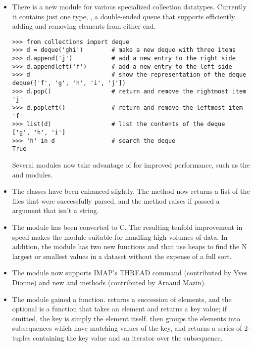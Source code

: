 \documentclass{howto}
\begin{document}
\begin{itemize}
\item There is a new  module for 
   various specialized collection datatypes.  
   Currently it contains just one type, , 
   a double-ended queue that supports efficiently adding and removing
   elements from either end.

\begin{verbatim}
>>> from collections import deque
>>> d = deque('ghi')        # make a new deque with three items
>>> d.append('j')           # add a new entry to the right side
>>> d.appendleft('f')       # add a new entry to the left side
>>> d                       # show the representation of the deque
deque(['f', 'g', 'h', 'i', 'j'])
>>> d.pop()                 # return and remove the rightmost item
'j'
>>> d.popleft()             # return and remove the leftmost item
'f'
>>> list(d)                 # list the contents of the deque
['g', 'h', 'i']
>>> 'h' in d                # search the deque
True  
\end{verbatim}

Several modules now take advantage of  for
improved performance, such as the  and
 modules.

\item The  classes have been enhanced slightly.
   The  method now returns a list of the files that
   were successfully parsed, and the  method raises
    if passed a  argument that isn't a
   string.

\item The  module has been converted to C.  The resulting
   tenfold improvement in speed makes the module suitable for handling
   high volumes of data.  In addition, the module has two new functions
    and  that use heaps to
   find the N largest or smallest values in a dataset without the
   expense of a full sort.

\item The  module now supports IMAP's THREAD command
(contributed by Yves Dionne) and new  and
 methods (contributed by Arnaud Mazin).

\item The  module gained a
   function.
   returns a succession of elements, and the optional
   is a function that takes an element and returns a key
  value; if omitted, the key is simply the element itself.
   then groups the elements into subsequences
  which have matching values of the key, and returns a series of 2-tuples
  containing the key value and an iterator over the subsequence.
 

\end{itemize}
\end{document}
